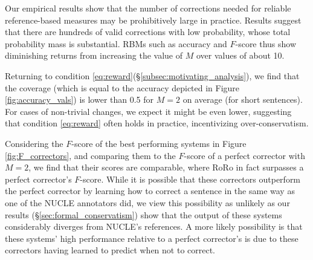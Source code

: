 \documentclass[letter,11pt]{article}
\newcommand{\oa}[1]{\footnote{\color{red}OA: #1}}
\begin{document}
Our empirical results show that the number of corrections needed for reliable reference-based measures may
be prohibitively large in practice.
Results suggest that there are hundreds of valid corrections with low probability, whose total probability mass
is substantial. RBMs such as accuracy and $F$-score thus show diminishing returns from increasing the value of $M$ over values of about 10.
%
%
%

Returning to condition \ref{eq:reward}(\S \ref{subsec:motivating_analysis}), we find that the coverage
(which is equal to the accuracy depicted in Figure \ref{fig:accuracy_vals})
is lower than 0.5 for $M=2$ on average (for short sentences). For cases of non-trivial
changes, we expect it might be even lower, suggesting that condition \ref{eq:reward} often
holds in practice, incentivizing over-conservatism.

Considering the $F$-score of the best performing systems in Figure \ref{fig:F_correctors}, and
comparing them to the $F$-score of a perfect corrector with $M=2$, we find that their scores are comparable,
where RoRo in fact surpasses a perfect corrector's $F$-score.
While it is possible that these correctors outperform the perfect corrector by learning how to
correct a sentence in the same way as one of the NUCLE annotators did, we view this possibility
as unlikely as our results (\S\ref{sec:formal_conservatism}) show that
the output of these systems considerably diverges from NUCLE's references.
A more likely possibility is that these systems' high performance relative to a perfect corrector's
is due to these correctors having learned to predict when not to correct.
\end{document}
